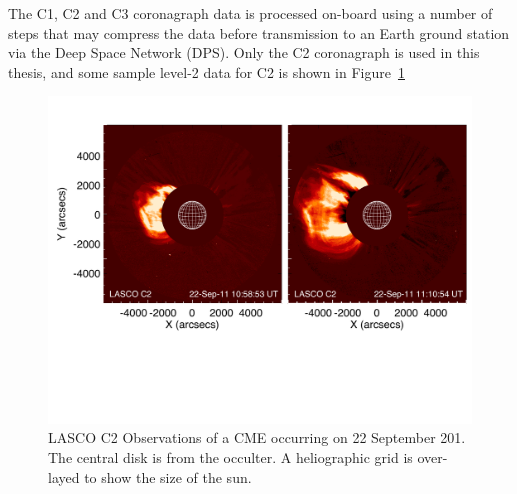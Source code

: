 The C1, C2 and C3 coronagraph data is processed on-board using a number of steps that may compress the data before transmission to an Earth ground station
via the Deep Space Network (DPS). 
Only the C2 coronagraph is used in this thesis, and some sample level-2 data for C2 is shown in Figure~\ref{fig:lasco_c2_obs}
\begin{figure}[!t]
\begin{center}
\includegraphics[scale=0.55, trim=2cm 6cm 1cm 2cm]{images/lasco_c2_thesis.pdf}
\caption[LASCO C2 Observations]{LASCO C2 Observations of a CME occurring on 22 September 201. The central disk is from the occulter. A heliographic grid is over-layed to show the size of the sun.}
\label{fig:lasco_c2_obs}
\end{center}
\end{figure}


